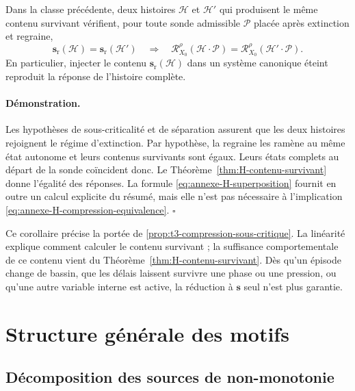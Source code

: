 \begin{encadre}[title={Corollaire \theproposition{} --- Compression sous-critique, Proposition~\ref{prop:t3-compression-sous-critique}}]
Dans la classe précédente, deux histoires $\mathcal H$ et
$\mathcal H'$ qui produisent le même contenu survivant vérifient, pour
toute sonde admissible $\mathcal P$ placée après extinction et regraine,
\begin{equation}
\label{eq:annexe-H-compression-equivalence}
\mathbf s_{\mathrm r}(\mathcal H)
=
\mathbf s_{\mathrm r}(\mathcal H')
\quad\Longrightarrow\quad
\mathcal R^{\rho}_{X_0}
(\mathcal H\cdot\mathcal P)
=
\mathcal R^{\rho}_{X_0}
(\mathcal H'\cdot\mathcal P).
\end{equation}
En particulier, injecter le contenu
$\mathbf s_{\mathrm r}(\mathcal H)$ dans un système canonique éteint
reproduit la réponse de l'histoire complète.
\end{encadre}

\paragraph{Démonstration.}
Les hypothèses de sous-criticalité et de séparation assurent que les
deux histoires rejoignent le régime d'extinction. Par hypothèse, la
regraine les ramène au même état autonome et leurs contenus survivants sont
égaux. Leurs états complets au départ de la sonde coïncident donc. Le
Théorème~\ref{thm:H-contenu-survivant} donne l'égalité des réponses. La formule
\eqref{eq:annexe-H-superposition} fournit en outre un calcul explicite du
résumé, mais elle n'est pas nécessaire à l'implication
\eqref{eq:annexe-H-compression-equivalence}. \hfill$\square$

Ce corollaire précise la portée de \ref{prop:t3-compression-sous-critique}. La linéarité explique comment
calculer le contenu survivant ; la suffisance comportementale de ce
contenu vient du Théorème~\ref{thm:H-contenu-survivant}. Dès qu'un épisode change de bassin, que
les délais laissent survivre une phase ou une pression, ou qu'une autre
variable interne est active, la réduction à $\mathbf s$ seul n'est plus
garantie.

\section{Structure générale des motifs}
\label{annexe-H-motifs}

\subsection{Décomposition des sources de non-monotonie}
\label{annexe-H-nonmonotonie}

